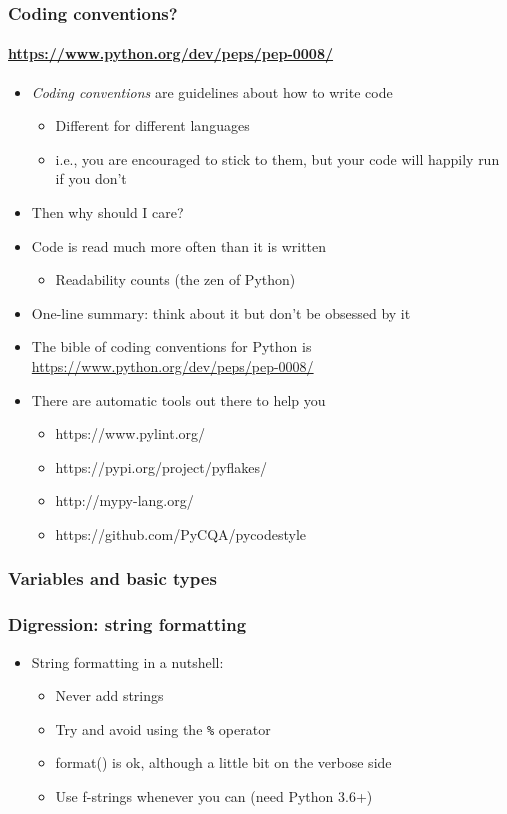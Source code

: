 \documentclass[9pt]{beamer}
\begin{document}
\begin{frame}
  \frametitle{Coding conventions?}
  \framesubtitle{\url{https://www.python.org/dev/peps/pep-0008/}}
  \begin{itemize}
  \item \emph{Coding conventions} are guidelines about how to write code
    \begin{itemize}
    \item Different for different languages
    \item i.e., you are encouraged to stick to them, but your code will
      happily run if you don't
    \end{itemize}
  \item \alert{Then why should I care?}
  \item Code is read much more often than it is written
    \begin{itemize}
    \item Readability counts (the zen of Python)
    \end{itemize}
  \item One-line summary: \alert{think about it but don't be obsessed by it}
  \item The bible of coding conventions for Python is \url{https://www.python.org/dev/peps/pep-0008/}
  \item There are automatic tools out there to help you
    \begin{itemize}
      \item https://www.pylint.org/
      \item https://pypi.org/project/pyflakes/
      \item http://mypy-lang.org/
      \item https://github.com/PyCQA/pycodestyle
    \end{itemize}
  \end{itemize}
\end{frame}


\begin{frame}
  \frametitle{Variables and basic types}
  
\end{frame}


\begin{frame}
  \frametitle{Digression: string formatting}
  
  \begin{itemize}
  \item String formatting in a nutshell:
    \begin{itemize}
    \item Never add strings
    \item Try and avoid using the \texttt{\%} operator
    \item format() is ok, although a little bit on the verbose side
    \item Use f-strings whenever you can (need Python 3.6+)
    \end{itemize}
  \end{itemize}
\end{frame}
\end{document}
